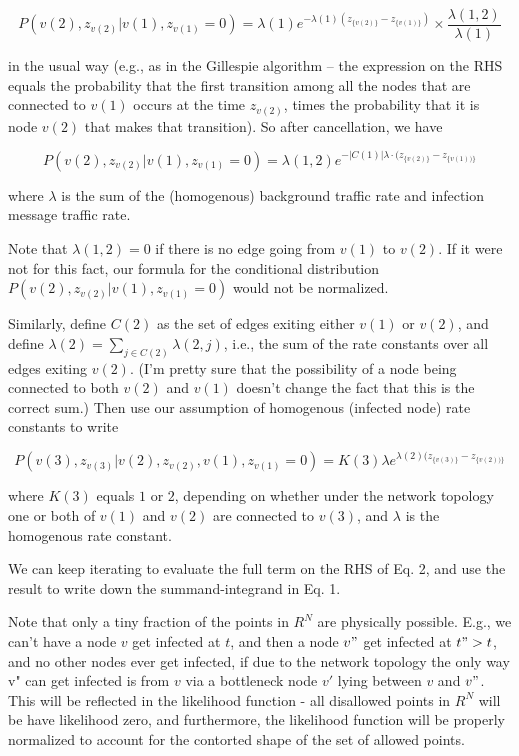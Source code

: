 \documentclass{article}
\begin{document}
	\begin{equation*}
		P(v(2), z_{v(2)} | v(1), z_{v(1)} = 0)  =
		\lambda(1) e^{- \lambda(1) (z_{\{v(2)\}} - z_{\{v(1)\}})} 
		\times \frac{\lambda(1,2)}{\lambda(1)}
	\end{equation*}

	in the usual way (e.g., as in the Gillespie algorithm -- the
	expression on the RHS equals the probability that the first transition
	among all the nodes that are connected to $v(1)$ occurs at the time
	$z_{v(2)}$, times the probability that it is node $v(2)$ that makes that
	transition). So after cancellation, we have
	
	\begin{equation*}
	P(v(2), z_{v(2)} | v(1), z_{v(1)} = 0) =
		\lambda(1, 2) e^{-|C(1)| \lambda \cdot (z_{\{v(2)\}} - z_{\{v(1))\}}}
	\end{equation*}

	where $\lambda$ is the sum of the (homogenous) background traffic rate
	and infection message traffic rate. 

	Note that $\lambda(1, 2) = 0$ if there is no edge going from $v(1)$ to
	$v(2)$. If it were not for this fact, our formula for the conditional
	distribution $P(v(2), z_{v(2)} | v(1), z_{v(1)} = 0)$ would not be
	normalized.

	Similarly, define $C(2)$ as the set of edges exiting either $v(1)$ or
	$v(2)$, and define $\lambda(2) = \sum_{j \in C(2)} \lambda(2,j)$, i.e., the
	sum of the rate constants over all edges exiting $v(2)$. (I'm pretty
	sure that the possibility of a node being connected to both $v(2)$ and
	$v(1)$ doesn't change the fact that this is the correct sum.)  Then use
	our assumption of homogenous (infected node) rate constants to write

	\begin{equation*}
		P(v(3), z_{v(3)} | v(2), z_{v(2)}, v(1), z_{v(1)} = 0)  =  
			K(3) \lambda e^{\lambda(2) (z_{\{v(3)\}} - z_{\{v(2))\}}} 
	\end{equation*}

	where $K(3)$ equals $1$ or $2$, depending on whether under the network
	topology one or both of $v(1)$ and $v(2)$ are connected to $v(3)$, and
	$\lambda$ is the homogenous rate constant.

	We can keep iterating to evaluate the full term on the RHS of Eq. 2, and
	use the result to write down the summand-integrand in Eq. 1. 

	Note that only a tiny fraction of the points in $R^{N}$ are physically
	possible. E.g., we can't have a node $v$ get infected at $t$, and then a
	node $v"$ get infected at $t" > t$, and no other nodes ever get infected,
	if due to the network topology the only way v" can get infected is
	from $v$ via a bottleneck node $v'$ lying between $v$ and $v"$. This will be
	reflected in the likelihood function - all disallowed points in $R^{N}$
	will be have likelihood zero, and furthermore, the likelihood function
	will be properly normalized to account for the contorted shape of the
	set of allowed points.
\end{document}
